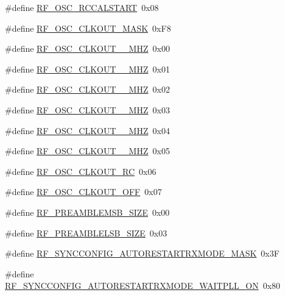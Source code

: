 \begin{DoxyCompactItemize}
\item 
\#define \hyperlink{sx1276Regs-Fsk_8h_aa7d737cc3597f1868d03ae2da0d2ef1e}{R\+F\+\_\+\+O\+S\+C\+\_\+\+R\+C\+C\+A\+L\+S\+T\+A\+RT}~0x08
\item 
\#define \hyperlink{sx1276Regs-Fsk_8h_ac744b47205236aa1bab6db5de6d763cb}{R\+F\+\_\+\+O\+S\+C\+\_\+\+C\+L\+K\+O\+U\+T\+\_\+\+M\+A\+SK}~0x\+F8
\item 
\#define \hyperlink{sx1276Regs-Fsk_8h_a39939037ef778589c2a012a432af4001}{R\+F\+\_\+\+O\+S\+C\+\_\+\+C\+L\+K\+O\+U\+T\+\_\+\_\+\+M\+HZ}~0x00
\item 
\#define \hyperlink{sx1276Regs-Fsk_8h_a35cb9b93f3c11029ba94d749886a74b0}{R\+F\+\_\+\+O\+S\+C\+\_\+\+C\+L\+K\+O\+U\+T\+\_\+\_\+\+M\+HZ}~0x01
\item 
\#define \hyperlink{sx1276Regs-Fsk_8h_af99ef1d509dbd26671e0643217f15d02}{R\+F\+\_\+\+O\+S\+C\+\_\+\+C\+L\+K\+O\+U\+T\+\_\+\_\+\+M\+HZ}~0x02
\item 
\#define \hyperlink{sx1276Regs-Fsk_8h_aa7a24066783679941d44574aff9f7f2b}{R\+F\+\_\+\+O\+S\+C\+\_\+\+C\+L\+K\+O\+U\+T\+\_\+\_\+\+M\+HZ}~0x03
\item 
\#define \hyperlink{sx1276Regs-Fsk_8h_a6971552c1ee1dea0c304a1ce1698b7f7}{R\+F\+\_\+\+O\+S\+C\+\_\+\+C\+L\+K\+O\+U\+T\+\_\+\_\+\+M\+HZ}~0x04
\item 
\#define \hyperlink{sx1276Regs-Fsk_8h_a1ca04775f201904ebc725b7d3e642c7b}{R\+F\+\_\+\+O\+S\+C\+\_\+\+C\+L\+K\+O\+U\+T\+\_\+\_\+\+M\+HZ}~0x05
\item 
\#define \hyperlink{sx1276Regs-Fsk_8h_a69fef930e480b9c06fcb24746b6531cf}{R\+F\+\_\+\+O\+S\+C\+\_\+\+C\+L\+K\+O\+U\+T\+\_\+\+RC}~0x06
\item 
\#define \hyperlink{sx1276Regs-Fsk_8h_a5bef2e0155da1ee7ba0486ddd82b36cc}{R\+F\+\_\+\+O\+S\+C\+\_\+\+C\+L\+K\+O\+U\+T\+\_\+\+O\+FF}~0x07
\item 
\#define \hyperlink{sx1276Regs-Fsk_8h_a350e72bb75827ba417c04247092659f2}{R\+F\+\_\+\+P\+R\+E\+A\+M\+B\+L\+E\+M\+S\+B\+\_\+\+S\+I\+ZE}~0x00
\item 
\#define \hyperlink{sx1276Regs-Fsk_8h_aad343150a42f37198320692e62456844}{R\+F\+\_\+\+P\+R\+E\+A\+M\+B\+L\+E\+L\+S\+B\+\_\+\+S\+I\+ZE}~0x03
\item 
\#define \hyperlink{sx1276Regs-Fsk_8h_a74e4ab5de0446cd3ca9dce0ddad065e3}{R\+F\+\_\+\+S\+Y\+N\+C\+C\+O\+N\+F\+I\+G\+\_\+\+A\+U\+T\+O\+R\+E\+S\+T\+A\+R\+T\+R\+X\+M\+O\+D\+E\+\_\+\+M\+A\+SK}~0x3F
\item 
\#define \hyperlink{sx1276Regs-Fsk_8h_ab3b88dea45b78b60a8c5e684dae4ef82}{R\+F\+\_\+\+S\+Y\+N\+C\+C\+O\+N\+F\+I\+G\+\_\+\+A\+U\+T\+O\+R\+E\+S\+T\+A\+R\+T\+R\+X\+M\+O\+D\+E\+\_\+\+W\+A\+I\+T\+P\+L\+L\+\_\+\+ON}~0x80

\end{DoxyCompactItemize}

